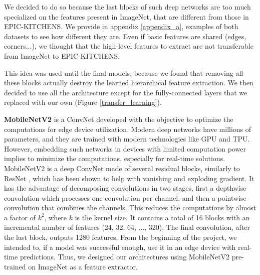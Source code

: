 \documentclass[12pt, a4paper]{report}
\begin{document}
				We decided to do so because the last blocks of such deep networks are too much specialized on the features present in ImageNet, that are different from those in EPIC-KITCHENS.
				We provide in appendix \ref{appendix_a}, examples of both datasets to see how different they are.
				Even if basic features are shared (edges, corners...), we thought that the high-level features to extract are not transferable from ImageNet to EPIC-KITCHENS.
				\par
				This idea was used until the final models, because we found that removing all these blocks actually destroy the learned hierarchical feature extraction.
				We then decided to use all the architecture except for the fully-connected layers that we replaced with our own (Figure \ref{transfer_learning}).
				\par
				\textbf{MobileNetV2} \cite{sandler2019mobilenetv2} is a ConvNet developed with the objective to optimize the computations for edge device utilization.
				Modern deep networks have millions of parameters, and they are trained with modern technologies like GPU and TPU.
				However, embedding such networks in devices with limited computation power implies to minimize the computations, especially for real-time solutions.
				MobileNetV2 is a deep ConvNet made of several residual blocks, similarly to ResNet \cite{he2015deep}, which has been shown to help with vanishing and exploding gradient.
				It has the advantage of decomposing convolutions in two stages, first a depthwise convolution which processes one convolution per channel, and then a pointwise convolution that combines the channels.
				This reduces the computations by almost a factor of $k^{2}$, where $k$ is the kernel size.
				It contains a total of 16 blocks with an incremental number of features (24, 32, 64, ..., 320).
				The final convolution, after the last block, outputs 1280 features.
				From the beginning of the project, we intended to, if a model was successful enough, use it in an edge device with real-time predictions.
				Thus, we designed our architectures using MobileNetV2 pre-trained on ImageNet as a feature extractor.
\end{document}
